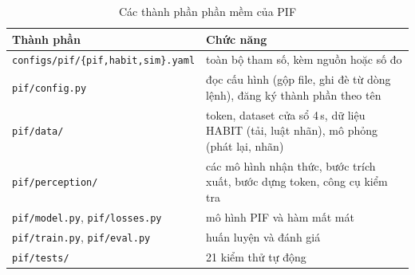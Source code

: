 \begin{table}[H]
  \centering
  \caption{Các thành phần phần mềm của PIF}
  \label{tab:software}
  \small
  \begin{tabularx}{\textwidth}{@{}lX@{}}
    \toprule
    Thành phần & Chức năng \\
    \midrule
    \texttt{configs/pif/\{pif,habit,sim\}.yaml} & toàn bộ tham số, kèm nguồn hoặc số đo \\
    \texttt{pif/config.py} & đọc cấu hình (gộp file, ghi đè từ dòng lệnh), đăng ký thành phần theo tên \\
    \texttt{pif/data/} & token, dataset cửa sổ 4\,s, dữ liệu HABIT (tải, luật nhãn), mô phỏng (phát lại, nhãn) \\
    \texttt{pif/perception/} & các mô hình nhận thức, bước trích xuất, bước dựng token, công cụ kiểm tra \\
    \texttt{pif/model.py}, \texttt{pif/losses.py} & mô hình PIF và hàm mất mát \\
    \texttt{pif/train.py}, \texttt{pif/eval.py} & huấn luyện và đánh giá \\
    \texttt{pif/tests/} & 21 kiểm thử tự động \\
    \bottomrule
  \end{tabularx}
\end{table}
